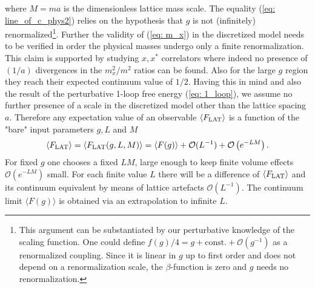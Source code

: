 where $M=ma$ is the dimensionless lattice mass scale. The equality (\ref{eq: line_of_c_phys2}) relies on the hypothesis that $g$ is not (infinitely) renormalized\footnote{This argument can be substantiated by our perturbative knowledge of the scaling function. One could define $f(g)/4 = g + \text{const.} + \mathcal{O}(g^{-1})$ as a renormalized coupling. Since it is linear in $g$ up to first order and does not depend on a renormalization scale, the $\beta$-function is zero and $g$ needs no renormalization.}. Further the validity of (\ref{eq: m_x}) in the discretized model needs to be verified in order the physical masses undergo only a finite renormalization. This claim is supported by studying $x,x^{*}$ correlators where indeed no presence of $(1/a)$ divergences in the $m_{x}^{2}/m^{2}$ ratios can be found. Also for the large $g$ region they reach their expected continuum value of $1/2$. Having this in mind and also the result of the perturbative 1-loop free energy (\ref{eq: 1_loop}), we assume no further presence of a scale in the discretized model other than the lattice spacing $a$. Therefore any expectation value of an observable $\langle F_{\rm LAT}\rangle$ is a function of the "bare" input parameters $g,L$ and $M$
%
%
\begin{equation}
\langle F_{\rm LAT}\rangle = \langle F_{\rm LAT}(g,L,M)\rangle = \langle F(g) \rangle + \mathcal{O}(L^{-1}) + \mathcal{O}\left( e^{-LM}\right).
\end{equation}
%
%
For fixed $g$ one chooses a fixed $LM$, large enough to keep finite volume effects $\mathcal{O}\left( e^{-LM}\right)$ small. For each finite value $L$ there will be a difference of $\langle F_{\rm LAT}\rangle$ and its continuum equivalent by means of lattice artefacts $\mathcal{O}(L^{-1})$. The continuum limit $\langle F(g) \rangle$ is obtained via an extrapolation to infinite $L$.
%
%
%
%
%
%
%
%
%
